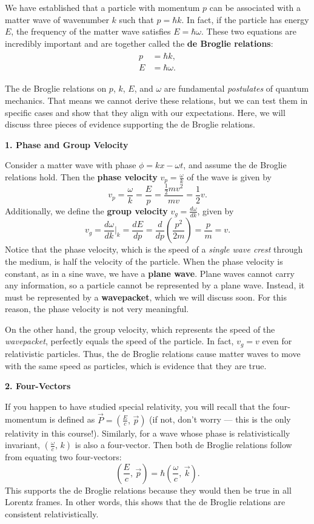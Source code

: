 We have established that a particle with momentum $p$ can be associated with a matter wave of wavenumber $k$ such that $p=\hbar k$. In fact, if the particle has energy $E$, the frequency of the matter wave satisfies $E=\hbar\omega$. These two equations are incredibly important and are together called the \textbf{de Broglie relations}: \begin{align*} \begin{split}
    p&=\hbar k, \\ E&=\hbar\omega.    
\end{split}\tag{de Broglie relations}
\end{align*}

The de Broglie relations on $p$, $k$, $E$, and $\omega$ are fundamental \textit{postulates} of quantum mechanics. That means we cannot derive these relations, but we can test them in specific cases and show that they align with our expectations. Here, we will discuss three pieces of evidence supporting the de Broglie relations. 

\textbf{1. Phase and Group Velocity}

Consider a matter wave with phase $\phi=kx-\omega t$, and assume the de Broglie relations hold. Then the \textbf{phase velocity} $v_p=\frac{\omega}{k}$ of the wave is given by $$v_p=\frac{\omega}{k}=\frac{E}{p}=\frac{\frac{1}{2}mv^2}{mv}=\frac{1}{2}v.$$
Additionally, we define the \textbf{group velocity} $v_g=\frac{d\omega}{dk}$, given by $$v_g=\frac{d\omega}{dk}\bigg|_k=\frac{dE}{dp}=\frac{d}{dp}(\frac{p^2}{2m})=\frac{p}{m}=v.$$
Notice that the phase velocity, which is the speed of a \textit{single wave crest} through the medium, is half the velocity of the particle. When the phase velocity is constant, as in a sine wave, we have a \textbf{plane wave}. Plane waves cannot carry any information, so a particle cannot be represented by a plane wave. Instead, it must be represented by a \textbf{wavepacket}, which we will discuss soon. For this reason, the phase velocity is not very meaningful.

On the other hand, the group velocity, which represents the speed of the \textit{wavepacket}, perfectly equals the speed of the particle. In fact, $v_g=v$ even for relativistic particles. Thus, the de Broglie relations cause matter waves to move with the same speed as particles, which is evidence that they are true.

\textbf{2. Four-Vectors}

If you happen to have studied special relativity, you will recall that the four-momentum is defined as $\vec{P}=(\frac{E}{c},\,\vec{p})$ (if not, don't worry --- this is the only relativity in this course!). Similarly, for a wave whose phase is relativistically invariant, $(\frac{\omega}{c},\,k)$  is also a four-vector. Then both de Broglie relations follow from equating two four-vectors: $$(\frac{E}{c},\,\vec{p})=\hbar(\frac{\omega}{c},\,\vec{k}).$$ This supports the de Broglie relations because they would then be true in all Lorentz frames. In other words, this shows that the de Broglie relations are consistent relativistically.

